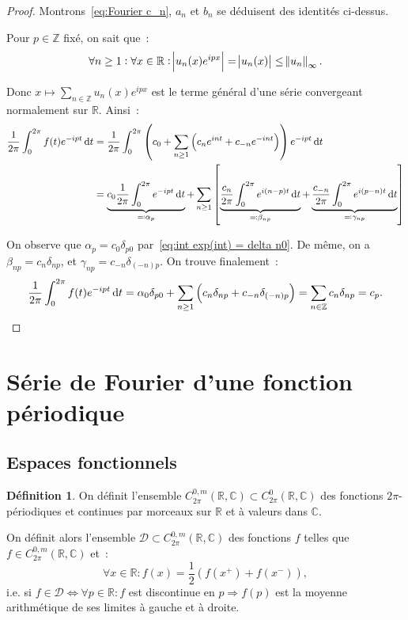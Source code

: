 \documentclass{report}
\theoremstyle{definition}
\newtheorem{déf}[thm]{Définition}
\theoremstyle{remark}
\numberwithin{equation}{section}
\newcommand{\C}{\mathbb C}
\newcommand{\R}{\mathbb R}
\newcommand{\Z}{\mathbb Z}
\newcommand{\CmT}[2]{C^{#1,m}_{#2}}
\newcommand{\CzmT}[1]{\CmT 0{#1}}
\newcommand{\Czm}{\CzmT{2\pi}}
\begin{document}
			\begin{proof} Montrons~\eqref{eq:Fourier c_n}, $a_n$ et $b_n$ se déduisent des identités ci-dessus.

			Pour $p \in \Z$ fixé, on sait que~:
			\begin{equation}
				\forall n \geq 1 : \forall x \in \R : \abs {u_n(x)e^{ipx}} = \abs {u_n(x)} \leq \norm {u_n}_\infty.
			\end{equation}

			Donc $x \mapsto \sum_{n \in \Z}u_n(x)e^{ipx}$ est le terme général d'une série convergeant normalement sur $\R$. Ainsi~:
			\begin{align}
				\frac 1{2\pi} \int_0^{2\pi}f(t)e^{-ipt}\dif t &= \frac 1{2\pi}\int_0^{2\pi}\left(c_0 + \sum_{n \geq 1}\left(c_ne^{int} + c_{-n}e^{-int}\right)\right)e^{-ipt}\dif t \\
					&= \underbrace {c_0\frac 1{2\pi}\int_0^{2\pi}e^{-ipt}\dif t}_{\eqqcolon \alpha_p}
						+ \sum_{n \geq 1}\left[\underbrace {\frac {c_n}{2\pi}\int_0^{2\pi}e^{i(n-p)t}\dif t}_{\eqqcolon \beta_{np}}
							+ \underbrace {\frac {c_{-n}}{2\pi}\int_0^{2\pi}e^{i(p-n)t}\dif t}_{\eqqcolon \gamma_{np}}\right]
			\end{align}

			On observe que $\alpha_p = c_0\delta_{p0}$ par~\eqref{eq:int exp(int) = delta n0}. De même, on a $\beta_{np} = c_n\delta_{np}$, et $\gamma_{np}
				= c_{-n}\delta_{(-n)p}$.
			On trouve finalement~:
			\begin{equation}
				\frac 1{2\pi}\int_0^{2\pi}f(t)e^{-ipt}\dif t = \alpha_0\delta_{p0} + \sum_{n \geq 1}\left(c_n\delta_{np} + c_{-n}\delta_{(-n)p}\right)
					= \sum_{n \in \Z}c_n\delta_{np} = c_p.
			\end{equation}
			\end{proof}

	\section{Série de Fourier d'une fonction périodique}
		\subsection{Espaces fonctionnels}
			\begin{déf} On définit l'ensemble $\Czm(\R, \C) \subset C^0_{2\pi}(\R, \C)$ des fonctions $2\pi$-périodiques et continues par morceaux sur $\R$ et
			à valeurs dans $\C$.

			On définit alors l'ensemble $\mathcal D \subset \Czm(\R, \C)$ des fonctions $f$ telles que $f \in \Czm(\R, \C)$ et~:
			\begin{equation}
				\forall x \in \R : f(x) = \frac 12(f(x^+)+f(x^-)),
			\end{equation}
			i.e. si $f \in \mathcal D \iff \forall p \in \R : f$ est discontinue en $p \Rightarrow f(p)$ est la moyenne arithmétique de ses limites à gauche et à droite.
			\end{déf}
\end{document}
